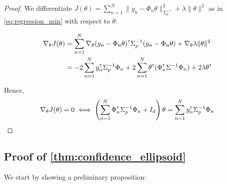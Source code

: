 \documentclass{article}
\begin{document}
\begin{proof}
We differentiate $J(\theta) = \sum_{n=1}^N \|y_n -\Phi_n\theta\|_{\Sigma_p^{-1}}^2 + \lambda\|\theta\|_{}^2$ as in  \eqref{eq:regression_min} with respect to $\theta$:

\begin{align*}
    \nabla_{\theta} J(\theta) &= \sum_{n=1}^N\nabla_{\theta} (y_n - \Phi_n\theta)^{\mathsf{\scriptscriptstyle T}}\Sigma_p^{-1}(y_n - \Phi_n\theta) + \nabla_{\theta} \lambda\|\theta\|_{}^2\\
    &= -2\sum_{n=1}^N y_n^{\mathsf{\scriptscriptstyle T}}\Sigma_p^{-1}\Phi_n + 2\sum_{n=1}^N\theta^{\mathsf{\scriptscriptstyle T}}(\Phi_n^{\mathsf{\scriptscriptstyle T}}\Sigma^{-1}\Phi_n) +  2 \lambda \theta^{\mathsf{\scriptscriptstyle T}}
\end{align*}

Hence,
\begin{align*}
    \nabla_{\theta} J(\theta) = 0 \iff \left(\sum_{n=1}^N\Phi_n^{\mathsf{\scriptscriptstyle T}}\Sigma_p^{-1}\Phi_n + I_d\right)\theta = \sum_{n=1}^N y_n^{\mathsf{\scriptscriptstyle T}}\Sigma_p^{-1}\Phi_n
\end{align*}
\end{proof}

\subsection{Proof of \autoref{thm:confidence_ellipsoid}}

We start by showing a preliminary proposition:
\end{document}
